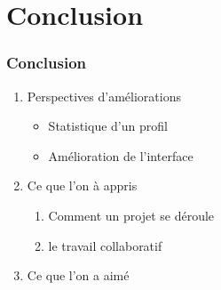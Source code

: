 \documentclass[12pt]{beamer}
\begin{document}
\section{Conclusion}
    \begin{frame}
    \frametitle{Conclusion}
        
        \begin{enumerate}
            \item Perspectives d'améliorations
            \begin{itemize}
                \item Statistique d'un profil
                \item Amélioration de l'interface 
            \end{itemize}
            
            \item Ce que l'on à appris
            \begin{enumerate}
                \item Comment un projet se déroule
                \item le travail collaboratif
            \end{enumerate}
            
            \item Ce que l'on a aimé
            
         
        \end{enumerate}
    \end{frame}
    
\appendix[Questions ?]
\end{document}
